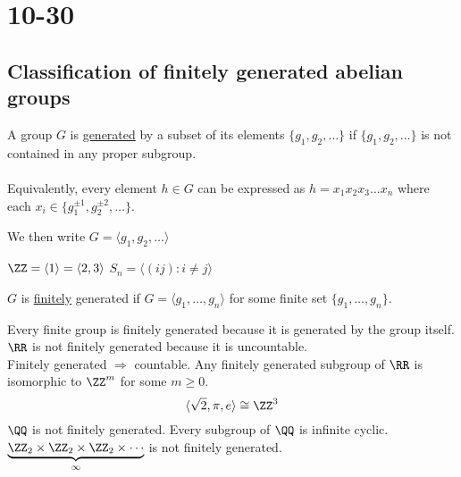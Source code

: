 \documentclass[class=scrartcl, crop=false]{standalone}
\begin{document}
\section{10-30}

\subsection{Classification of finitely generated abelian groups}

\begin{definition}
  A group $G$ is \ul{generated} by a subset of its elements $\{g_1, g_2, \dots\}$ 
  if $\{g_1, g_2, \dots\}$ is not contained in any proper subgroup.
  \\\\
  Equivalently, every element $h \in G$ can be expressed as $h = x_1x_2x_3\dots x_n$ where each $x_i \in \{g_1^{\pm 1}, g_2^{\pm 2}, \dots \}$.
  \begin{note}
    We then write $G = \langle g_1, g_2, \dots \rangle $
  \end{note}
\end{definition}

\begin{example}
  \begin{enumerate}
    \ii[]
    \ii
    $\ZZ = \langle 1 \rangle = \langle 2, 3 \rangle $
    \ii
    $S_n = \langle (ij) : i \neq j \rangle $
  \end{enumerate}
\end{example}

\begin{definition}
  $G$ is \ul{finitely} generated if  $G = \langle g_1, \dots, g_n \rangle $ for some finite set $\{g_1, \dots, g_n\}$.
  \begin{example}
    \begin{enumerate}
      \ii[]
      \ii
      Every finite group is finitely generated because it is generated by the group itself.
      \ii
      $\RR$ is not finitely generated because it is uncountable.\\
      Finitely generated  $\Rightarrow$ countable.
      \ii
      Any finitely generated subgroup of $\RR$ is isomorphic to $\ZZ^m$ for some $m \geq 0$.
      \[
        \langle \sqrt{2}, \pi, e \rangle \cong \ZZ^3
      \]
      \ii
      $\QQ$ is not finitely generated. Every subgroup of $\QQ$ is infinite cyclic.
      \ii
      $\underbrace{\ZZ_2 \times \ZZ_2 \times \ZZ_2 \times \cdots}_{\infty}$ is not finitely generated.
    \end{enumerate}
  \end{example}
\end{definition}
\end{document}

